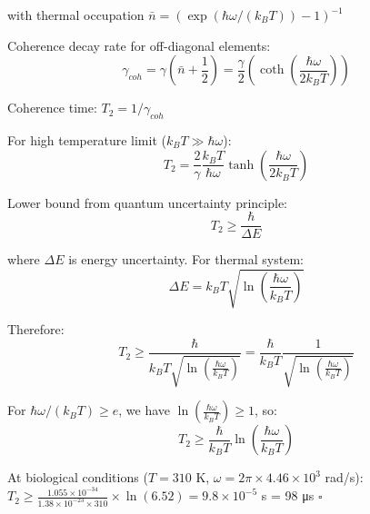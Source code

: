 with thermal occupation $\bar{n} = (\exp(\hbar\omega/(k_B T)) - 1)^{-1}$

Coherence decay rate for off-diagonal elements:
\begin{equation}
\gamma_{coh} = \gamma(\bar{n} + \frac{1}{2}) = \frac{\gamma}{2}\left(\coth\left(\frac{\hbar\omega}{2k_B T}\right)\right)
\end{equation}

Coherence time: $T_2 = 1/\gamma_{coh}$

For high temperature limit ($k_B T \gg \hbar \omega$):
\begin{equation}
T_2 = \frac{2}{\gamma} \frac{k_B T}{\hbar \omega} \tanh\left(\frac{\hbar\omega}{2k_B T}\right)
\end{equation}

Lower bound from quantum uncertainty principle:
\begin{equation}
T_2 \geq \frac{\hbar}{\Delta E}
\end{equation}

where $\Delta E$ is energy uncertainty. For thermal system:
\begin{equation}
\Delta E = k_B T \sqrt{\ln\left(\frac{\hbar\omega}{k_B T}\right)}
\end{equation}

Therefore:
\begin{equation}
T_2 \geq \frac{\hbar}{k_B T \sqrt{\ln\left(\frac{\hbar\omega}{k_B T}\right)}} = \frac{\hbar}{k_B T} \frac{1}{\sqrt{\ln\left(\frac{\hbar\omega}{k_B T}\right)}}
\end{equation}

For $\hbar\omega/(k_B T) \geq e$, we have $\ln\left(\frac{\hbar\omega}{k_B T}\right) \geq 1$, so:
\begin{equation}
T_2 \geq \frac{\hbar}{k_B T} \ln\left(\frac{\hbar\omega}{k_B T}\right)
\end{equation}

At biological conditions ($T = 310$ K, $\omega = 2\pi \times 4.46 \times 10^3$ rad/s):
$T_2 \geq \frac{1.055 \times 10^{-34}}{1.38 \times 10^{-23} \times 310} \times \ln(6.52) = 9.8 \times 10^{-5}$ s = 98 μs $\square$
